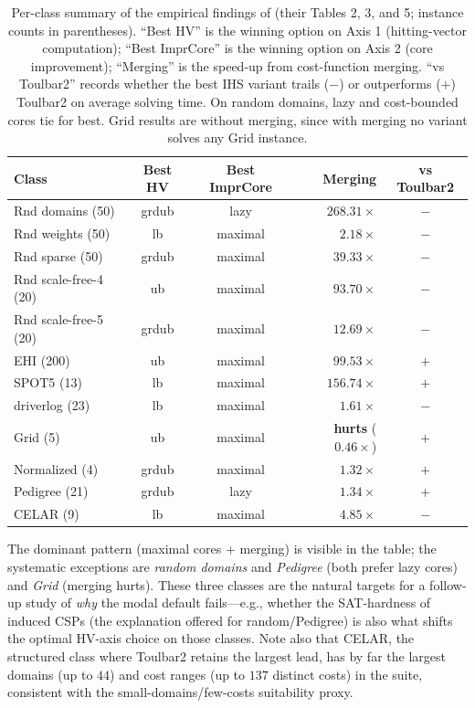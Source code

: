 \begin{table}[htbp]
\centering
\small
\caption{Per-class summary of the empirical findings of
\citet{petrova2025empirical} (their Tables 2, 3, and 5; instance counts in
parentheses). ``Best HV'' is the winning option on Axis 1 (hitting-vector
computation); ``Best ImprCore'' is the winning option on Axis 2 (core
improvement); ``Merging'' is the speed-up from cost-function merging. ``vs
Toulbar2'' records whether the best IHS variant trails ($-$) or outperforms
($+$) Toulbar2 on average solving time. On random domains, lazy and
cost-bounded cores tie for best. Grid results are without merging, since
with merging no variant solves any Grid instance.}
\label{tab:wcspclasses}
\begin{tabular}{l c c r c}
\toprule
\textbf{Class} & \textbf{Best HV} & \textbf{Best ImprCore} & \textbf{Merging} & \textbf{vs Toulbar2} \\
\midrule
Rnd domains (50)      & grdub & lazy    & $268.31\times$ & $-$ \\
Rnd weights (50)      & lb    & maximal & $2.18\times$   & $-$ \\
Rnd sparse (50)       & grdub & maximal & $39.33\times$  & $-$ \\
Rnd scale-free-4 (20) & ub    & maximal & $93.70\times$  & $-$ \\
Rnd scale-free-5 (20) & grdub & maximal & $12.69\times$  & $-$ \\
EHI (200)             & ub    & maximal & $99.53\times$  & $+$ \\
SPOT5 (13)            & lb    & maximal & $156.74\times$ & $+$ \\
driverlog (23)        & lb    & maximal & $1.61\times$   & $-$ \\
Grid (5)              & ub    & maximal & \textbf{hurts} ($0.46\times$) & $+$ \\
Normalized (4)        & grdub & maximal & $1.32\times$   & $+$ \\
Pedigree (21)         & grdub & lazy    & $1.34\times$   & $+$ \\
CELAR (9)             & lb    & maximal & $4.85\times$   & $-$ \\
\bottomrule
\end{tabular}
\end{table}

The dominant pattern (maximal cores + merging) is visible in the table; the
systematic exceptions are \emph{random domains} and \emph{Pedigree}
(both prefer lazy cores) and \emph{Grid} (merging hurts). These three classes
are the natural targets for a follow-up study of \emph{why} the modal default
fails---e.g., whether the SAT-hardness of induced CSPs (the explanation
offered for random/Pedigree) is also what shifts the optimal HV-axis choice
on those classes. Note also that CELAR, the structured class where Toulbar2
retains the largest lead, has by far the largest domains (up to $44$) and
cost ranges (up to $137$ distinct costs) in the suite, consistent with the
small-domains/few-costs suitability proxy.

